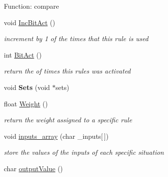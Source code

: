 \begin{DoxyCompactItemize}
\begin{DoxyCompactList}
 Function\-: compare \end{DoxyCompactList}\item 
\hypertarget{classMOFSRule_af000140a606651c765b339877935318a}{void \hyperlink{classMOFSRule_af000140a606651c765b339877935318a}{Inc\-Bit\-Act} ()}\label{classMOFSRule_af000140a606651c765b339877935318a}

\begin{DoxyCompactList}\small\item\em increment by 1 of the times that this rule is used \end{DoxyCompactList}\item 
\hypertarget{classMOFSRule_a879c89266d1ddbdae4b2eef1b4b24397}{int \hyperlink{classMOFSRule_a879c89266d1ddbdae4b2eef1b4b24397}{Bit\-Act} ()}\label{classMOFSRule_a879c89266d1ddbdae4b2eef1b4b24397}

\begin{DoxyCompactList}\small\item\em return the of times this rules was activated \end{DoxyCompactList}\item 
\hypertarget{classMOFSRule_ab7bb3492a1e178c244e72782235b0d7c}{void {\bfseries Sets} (void $\ast$sets)}\label{classMOFSRule_ab7bb3492a1e178c244e72782235b0d7c}

\item 
\hypertarget{classMOFSRule_a2974f43ecec7a022007ca376105f91e3}{float \hyperlink{classMOFSRule_a2974f43ecec7a022007ca376105f91e3}{Weight} ()}\label{classMOFSRule_a2974f43ecec7a022007ca376105f91e3}

\begin{DoxyCompactList}\small\item\em return the weight assigned to a specific rule \end{DoxyCompactList}\item 
\hypertarget{classMOFSRule_a328682458ad9f1e5d6367b31111c90b6}{void \hyperlink{classMOFSRule_a328682458ad9f1e5d6367b31111c90b6}{inputs\-\_\-array} (char \-\_\-inputs\mbox{[}$\,$\mbox{]})}\label{classMOFSRule_a328682458ad9f1e5d6367b31111c90b6}

\begin{DoxyCompactList}\small\item\em store the values of the inputs of each specific situation \end{DoxyCompactList}\item 
\hypertarget{classMOFSRule_adef43b9e04fa74b8e12d71c28a78aded}{char \hyperlink{classMOFSRule_adef43b9e04fa74b8e12d71c28a78aded}{output\-Value} ()}\label{classMOFSRule_adef43b9e04fa74b8e12d71c28a78aded}


\end{DoxyCompactItemize}
